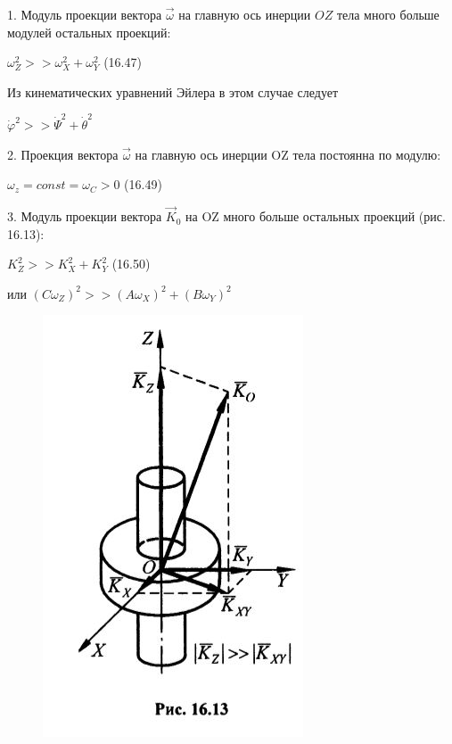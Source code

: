 {\begin{center}
    \par 1. Модуль проекции вектора $\vec{\omega}$ на главную ось инерции $OZ$ тела много больше модулей остальных проекций:

    \par $\omega^{2}_{Z} >> \omega^{2}_{X} + \omega^{2}_{Y} $ \qquad  (16.47)
    \par Из кинематических уравнений Эйлера в этом случае следует
    \par $ \dot \varphi^{2} >> \dot \Psi^{2} + \dot \theta^{2}$

    \par 2. Проекция вектора $\vec{\omega}$  на главную ось инерции OZ тела  постоянна по модулю:

    \par $\omega_{z} = const = \omega_{C} >0 $ \qquad  (16.49)
    \par 3. Модуль проекции вектора $ \vec{K}_{0}$ на OZ много больше остальных проекций (рис. 16.13):
    \par $K_{Z}^{2} >> K_{X}^{2} + K_{Y}^{2} $ \qquad  (16.50)
    \par или $(C\omega_{Z})^{2} >> (A\omega_{X})^{2} + (B\omega_{Y})^{2} $

    \begin{figure}[H]
    \centering \includegraphics[scale = 0.5]{img/16.13.JPG}
    \end{figure}


\end{center}}
